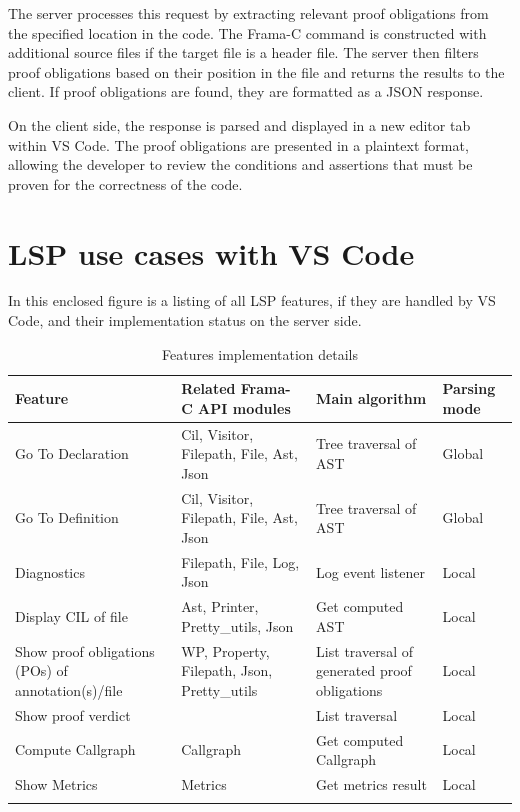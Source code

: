 \documentclass[10pt]{article}
\begin{document}
\begin{singlespace}
The server processes this request by extracting relevant proof obligations from the specified location in the code. The Frama-C command is constructed with additional source files if the target file is a header file. The server then filters proof obligations based on their position in the file and returns the results to the client. If proof obligations are found, they are formatted as a JSON response.

On the client side, the response is parsed and displayed in a new editor tab within VS Code. The proof obligations are presented in a plaintext format, allowing the developer to review the conditions and assertions that must be proven for the correctness of the code.







\section{LSP use cases with VS Code}
In this enclosed figure is a listing of all LSP features, if they are handled by VS Code, and their implementation status on the server side.
\begin{longtable}[H]{|p{3cm}|p{4cm}|p{4cm}|l|}
	\hline
	\textbf{Feature}                             & \textbf{Related Frama-C API modules}        & \textbf{Main algorithm} & \textbf{Parsing mode} \\ \hline
	Go To Declaration   & Cil, Visitor, Filepath, File, Ast, Json & Tree traversal of AST & Global \\ \hline
	Go To Definition    & Cil, Visitor, Filepath, File, Ast, Json & Tree traversal of AST & Global \\ \hline
	Diagnostics         & Filepath, File, Log, Json               & Log event listener & Local  \\ \hline
	Display CIL of file & Ast, Printer, Pretty\_utils, Json       & Get computed AST           & Local  \\ \hline
	Show proof obligations (POs) of annotation(s)/file & WP, Property, Filepath, Json, Pretty\_utils & List traversal of generated proof obligations          & Local                 \\ \hline
	Show proof verdict  &                                         & List traversal & Local  \\ \hline
	Compute Callgraph   & Callgraph                               & Get computed Callgraph           & Local  \\ \hline
	Show Metrics        & Metrics                                 & Get metrics result           & Local  \\ \hline
	\caption{Features implementation details}
	\label{tab:features-implementation-details}
\end{longtable}


\end{singlespace}
\end{document}
